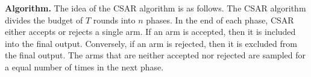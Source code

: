\documentclass{article}
\newcommand{\junk}[1]{}
\newcommand{\AlgorithmBud}{{\small \textsf{CSAR}}\xspace}
\begin{document}
\textbf{Algorithm.}
The idea of the \AlgorithmBud algorithm is as follows.
The \AlgorithmBud algorithm divides the budget of $T$ rounds into $n$ phases. 
In the end of each phase, \AlgorithmBud either accepts or rejects a single arm. 
If an arm is accepted, then it is included into the final output. 
Conversely, if an arm is rejected, then it is excluded from the final output.
The arms that are neither accepted nor rejected are sampled for a equal number of times in the next phase.
\junk{We see that the major challenge here is to choose a correct arm to accept/reject. 
For decision classes with non-trivial combinatorial structures, one cannot simply accept/reject arms according to their empirical means, since an arm with small expected reward may belong to the optimal set.
We resolve this challenge by using a novel gap estimation method for decision making and demonstrate that \AlgorithmBud can achieve a small probability of error.}
\end{document}
